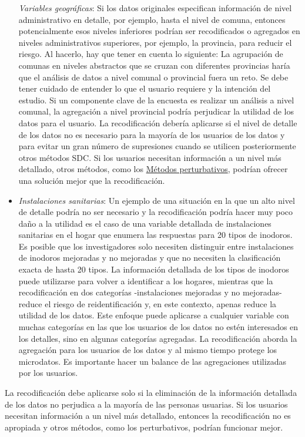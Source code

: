 \documentclass[
]{book}
\theoremstyle{definition}
\theoremstyle{definition}
\theoremstyle{definition}
\theoremstyle{definition}
\theoremstyle{remark}
\begin{document}
\begin{itemize}
  \emph{Variables geográficas}: Si los datos originales especifican información de nivel administrativo en detalle, por ejemplo, hasta el nivel de comuna, entonces potencialmente esos niveles inferiores podrían ser recodificados o agregados en niveles administrativos superiores, por ejemplo, la provincia, para reducir el riesgo. Al hacerlo, hay que tener en cuenta lo siguiente: La agrupación de comunas en niveles abstractos que se cruzan con diferentes provincias haría que el análisis de datos a nivel comunal o provincial fuera un reto. Se debe tener cuidado de entender lo que el usuario requiere y la intención del estudio. Si un componente clave de la encuesta es realizar un análisis a nivel comunal, la agregación a nivel provincial podría perjudicar la utilidad de los datos para el usuario. La recodificación debería aplicarse si el nivel de detalle de los datos no es necesario para la mayoría de los usuarios de los datos y para evitar un gran número de supresiones cuando se utilicen posteriormente otros métodos SDC. Si los usuarios necesitan información a un nivel más detallado, otros métodos, como los \protect\hyperlink{muxe9todos-perturbativos}{Métodos perturbativos}, podrían ofrecer una solución mejor que la recodificación.
\item
  \emph{Instalaciones sanitarias}: Un ejemplo de una situación en la que un alto nivel de detalle podría no ser necesario y la recodificación podría hacer muy poco daño a la utilidad es el caso de una variable detallada de instalaciones sanitarias en el hogar que enumera las respuestas para 20 tipos de inodoros. Es posible que los investigadores solo necesiten distinguir entre instalaciones de inodoros mejoradas y no mejoradas y que no necesiten la clasificación exacta de hasta 20 tipos. La información detallada de los tipos de inodoros puede utilizarse para volver a identificar a los hogares, mientras que la recodificación en dos categorías -instalaciones mejoradas y no mejoradas- reduce el riesgo de reidentificación y, en este contexto, apenas reduce la utilidad de los datos. Este enfoque puede aplicarse a cualquier variable con muchas categorías en las que los usuarios de los datos no estén interesados en los detalles, sino en algunas categorías agregadas. La recodificación aborda la agregación para los usuarios de los datos y al mismo tiempo protege los microdatos. Es importante hacer un balance de las agregaciones utilizadas por los usuarios.
\end{itemize}

La recodificación debe aplicarse solo si la eliminación de la información detallada de los datos no perjudica a la mayoría de las personas usuarias. Si los usuarios necesitan información a un nivel más detallado, entonces la recodificación no es apropiada y otros métodos, como los perturbativos, podrían funcionar mejor.
\end{document}
